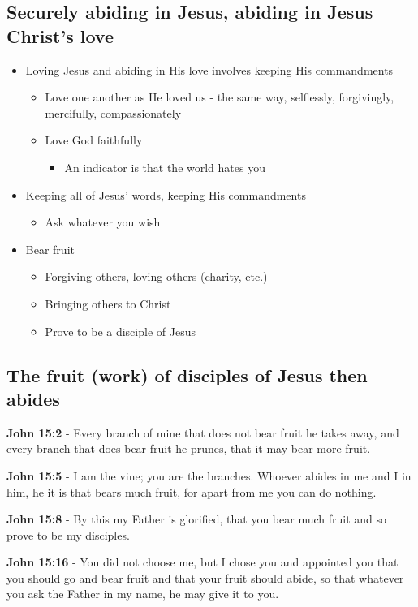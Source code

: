 \documentclass[11pt]{article}
\begin{document}
\subsection{Securely abiding in Jesus, abiding in Jesus Christ's love}
\label{sec:orgcacbfd2}
\begin{itemize}
\item Loving Jesus and abiding in His love involves keeping His commandments
\begin{itemize}
\item Love one another as He loved us - the same way, selflessly, forgivingly, mercifully, compassionately
\item Love God faithfully
\begin{itemize}
\item An indicator is that the world hates you
\end{itemize}
\end{itemize}
\item Keeping all of Jesus' words, keeping His commandments
\begin{itemize}
\item Ask whatever you wish
\end{itemize}
\item Bear fruit
\begin{itemize}
\item Forgiving others, loving others (charity, etc.)
\item Bringing others to Christ
\item Prove to be a disciple of Jesus
\end{itemize}
\end{itemize}

\subsection{The fruit (work) of disciples of Jesus then abides}
\label{sec:orge1ee13b}
\textbf{John 15:2} - Every branch of mine that does not bear fruit he takes away, and every branch that does bear fruit he prunes, that it may bear more fruit.

\textbf{John 15:5} - I am the vine; you are the branches. Whoever abides in me and I in him, he it is that bears much fruit, for apart from me you can do nothing.

\textbf{John 15:8} - By this my Father is glorified, that you bear much fruit and so prove to be my disciples.

\textbf{John 15:16} - You did not choose me, but I chose you and appointed you that you should go and bear fruit and that your fruit should abide, so that whatever you ask the Father in my name, he may give it to you.
\end{document}
